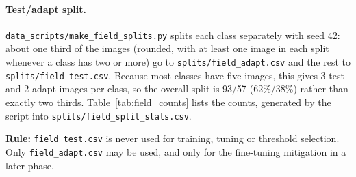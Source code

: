 \paragraph{Test/adapt split.}
\texttt{data\_scripts/make\_field\_splits.py} splits each class separately with seed 42: about one third of the images (rounded, with at least one image in each split whenever a class has two or more) go to \texttt{splits/field\_adapt.csv} and the rest to \texttt{splits/field\_test.csv}. Because most classes have five images, this gives 3 test and 2 adapt images per class, so the overall split is 93/57 (62\%/38\%) rather than exactly two thirds. Table~\ref{tab:field_counts} lists the counts, generated by the script into \texttt{splits/field\_split\_stats.csv}.

\textbf{Rule:} \texttt{field\_test.csv} is never used for training, tuning or threshold selection. Only \texttt{field\_adapt.csv} may be used, and only for the fine-tuning mitigation in a later phase.

